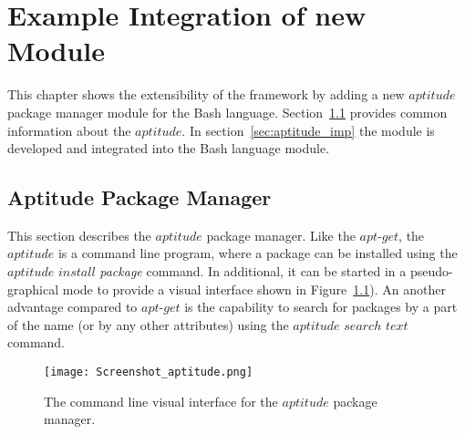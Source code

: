 
\chapter{Example Integration of new Module}\label{chap:add}
This chapter shows the extensibility of the framework by adding a new $aptitude$ package manager module for the Bash language. %
Section~\ref{sec:aptitude} provides common information about the $aptitude$. %
In section~\ref{sec:aptitude_imp} the module is developed and integrated into the Bash language module.

\section{Aptitude Package Manager}\label{sec:aptitude}
This section describes the $aptitude$ package manager.
Like the $apt$-$get$, the $aptitude$ is a command line program, where a package can be installed using the $aptitude$ $install$ \emph{package} command. 
In additional, it can be started in a pseudo-graphical mode to provide a visual interface shown in Figure~\ref{fig:aptitude_gui}).
An another advantage compared to $apt$-$get$ is the capability to search for packages by a part of the name (or by any other attributes) using the $aptitude$ $search$ $text$ command.
\begin{figure}[ht]   
	\centering
	\texttt{[image: Screenshot\_aptitude.png]}
	\caption{The command line visual interface for the $aptitude$ package manager.}
	\label{fig:aptitude_gui}
\end{figure}


